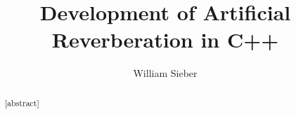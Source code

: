 \documentclass[12pt,palatino,code,picins,kaukecopyright,openright,woolshort,dropcaps,verbatim,index,euler]{woosterthesis}
\title{Development of Artificial Reverberation in C++}
\author{William Sieber}
\begin{document}
%
%

\frontmatter
\maketitle
\clearpage\thispagestyle{empty}\null\clearpage
\disscopyright 

%                                                                                       
%                                                                                       

\begin{abstract}
[abstract]
\end{abstract}

%                                                                                       
%                                                                                       

\end{document}
